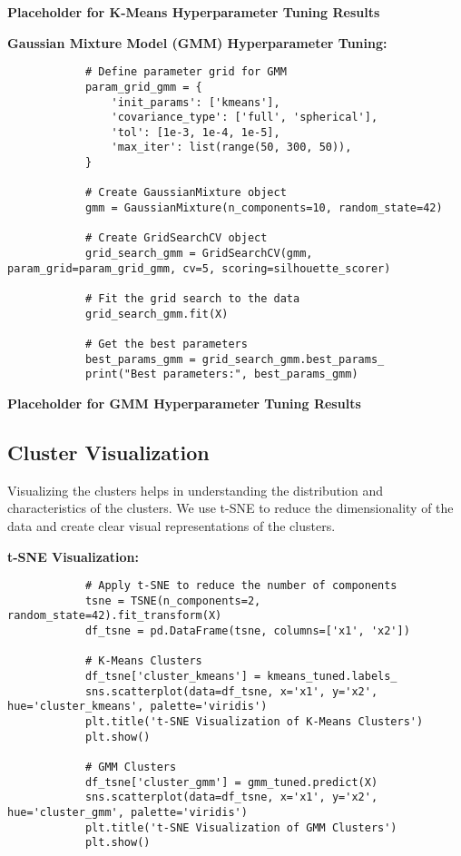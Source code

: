         \textbf{Placeholder for K-Means Hyperparameter Tuning Results}

        \textbf{Gaussian Mixture Model (GMM) Hyperparameter Tuning:}

        \begin{verbatim}
            # Define parameter grid for GMM
            param_grid_gmm = {
                'init_params': ['kmeans'],
                'covariance_type': ['full', 'spherical'],
                'tol': [1e-3, 1e-4, 1e-5],
                'max_iter': list(range(50, 300, 50)),
            }
            
            # Create GaussianMixture object
            gmm = GaussianMixture(n_components=10, random_state=42)
            
            # Create GridSearchCV object
            grid_search_gmm = GridSearchCV(gmm, param_grid=param_grid_gmm, cv=5, scoring=silhouette_scorer)
            
            # Fit the grid search to the data
            grid_search_gmm.fit(X)
            
            # Get the best parameters
            best_params_gmm = grid_search_gmm.best_params_
            print("Best parameters:", best_params_gmm)
        \end{verbatim}

        \textbf{Placeholder for GMM Hyperparameter Tuning Results}
            
    \subsection{Cluster Visualization}
    
        Visualizing the clusters helps in understanding the distribution and characteristics of the clusters. We use t-SNE to reduce the dimensionality of the data and create clear visual representations of the clusters.

        \textbf{t-SNE Visualization:}

        \begin{verbatim}
            # Apply t-SNE to reduce the number of components
            tsne = TSNE(n_components=2, random_state=42).fit_transform(X)
            df_tsne = pd.DataFrame(tsne, columns=['x1', 'x2'])
            
            # K-Means Clusters
            df_tsne['cluster_kmeans'] = kmeans_tuned.labels_
            sns.scatterplot(data=df_tsne, x='x1', y='x2', hue='cluster_kmeans', palette='viridis')
            plt.title('t-SNE Visualization of K-Means Clusters')
            plt.show()
            
            # GMM Clusters
            df_tsne['cluster_gmm'] = gmm_tuned.predict(X)
            sns.scatterplot(data=df_tsne, x='x1', y='x2', hue='cluster_gmm', palette='viridis')
            plt.title('t-SNE Visualization of GMM Clusters')
            plt.show()
        \end{verbatim}

